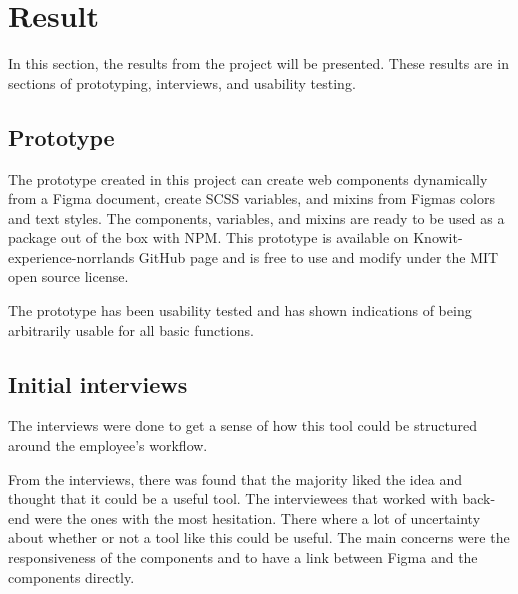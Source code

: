 \section{Result}


In this section, the results from the project will be presented. These results are in sections of prototyping, interviews, and usability testing.

\subsection{Prototype}%
\label{sub:Prototype}
The prototype created in this project can create web components dynamically from a Figma document, create SCSS variables, and mixins from Figmas colors and text styles. The components, variables, and mixins are ready to be used as a package out of the box with NPM. This prototype is available on Knowit-experience-norrlands GitHub page and is free to use and modify under the MIT open source license.

The prototype has been usability tested and has shown indications of being arbitrarily usable for all basic functions.

\subsection{Initial interviews}%
\label{sub:Initial interviews}
The interviews were done to get a sense of how this tool could be structured around the employee's workflow.

From the interviews, there was found that the majority liked the idea and thought that it could be a useful tool. The interviewees that worked with back-end were the ones with the most hesitation. There where a lot of uncertainty about whether or not a tool like this could be useful. The main concerns were the responsiveness of the components and to have a link between Figma and the components directly.

